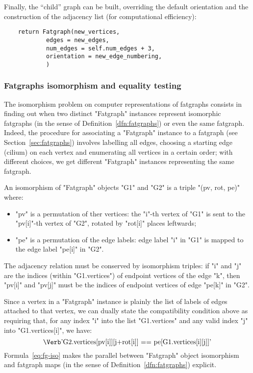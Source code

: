 Finally, the ``child'' graph can be built, overriding the default
orientation and the construction of the adjacency list (for
computational efficiency):
\begin{lstlisting}
    return Fatgraph(new_vertices,
            edges = new_edges,
            num_edges = self.num_edges + 3,
            orientation = new_edge_numbering,
            )
\end{lstlisting}


\subsubsection{Fatgraphs isomorphism and equality testing}
\label{sec:isomorphism}

The isomorphism problem on computer representations of fatgraphs
consists in finding out when two distinct "Fatgraph" instances
represent isomorphic fatgraphs (in the sense of
Definition~\ref{dfn:fatgraphs}) or even the same fatgraph.  Indeed,
the procedure for associating a "Fatgraph" instance to a fatgraph (see
Section~\ref{sec:fatgraphs}) involves labelling all edges, choosing a
starting edge (cilium) on each vertex and enumerating all vertices in
a certain order; with different choices, we get different "Fatgraph"
instances representing the same fatgraph.

\begin{definition}
  An isomorphism of "Fatgraph" objects "G1" and "G2" is a triple 
  "(pv, rot, pe)" where:
  \begin{itemize}
  \item "pv" is a permutation of ther vertices: the "i"-th vertex of
    "G1" is sent to the "pv[i]"-th vertex of "G2", rotated by "rot[i]"
    places leftwards;
  \item "pe" is a permutation of the edge labels: edge label "i" in
    "G1" is mapped to the edge label "pe[i]" in "G2".
  \end{itemize}
  The adjacency relation must be conserved by isomorphism triples: if
  "i" and "j" are the indices (within "G1.vertices") of endpoint
  vertices of the edge "k", then "pv[i]" and "pv[j]" must be the
  indices of endpoint vertices of edge "pe[k]" in "G2".
\end{definition}
Since a vertex in a "Fatgraph" instance is plainly the list of labels
of edges attached to that vertex, we can dually state the
compatibility condition above as requiring that, for any index "i"
into the list "G1.vertices" and any valid index "j" into
"G1.vertices[i]", we have:
\begin{equation}
  \label{eq:fg-iso}
  \text{\protect\Verb'G2.vertices[pv[i]][j+rot[i]] == pe[G1.vertices[i][j]]'}
\end{equation}
Formula~\eqref{eq:fg-iso} makes the parallel between "Fatgraph" object
isomorphism and fatgraph maps (in the sense of
Definition~\ref{dfn:fatgraphs}) explicit.


